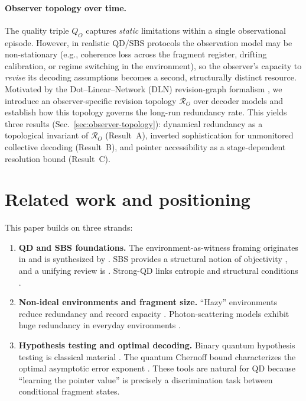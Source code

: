 \documentclass[11pt]{article}
\newcommand{\cR}{\mathcal{R}}
\newcommand{\1}{\mathbf{1}}
\theoremstyle{definition}
\theoremstyle{plain}
\begin{document}
\paragraph{Observer topology over time.}
The quality triple $Q_O$ captures \emph{static} limitations within a single observational episode.  However, in realistic QD/SBS protocols the observation model may be non-stationary (e.g., coherence loss across the fragment register, drifting calibration, or regime switching in the environment), so the observer's capacity to \emph{revise} its decoding assumptions becomes a second, structurally distinct resource.  Motivated by the Dot--Linear--Network (DLN) revision-graph formalism \citep{WuDLNCompression2026preprint}, we introduce an observer-specific revision topology $\cR_O$ over decoder models and establish how this topology governs the long-run redundancy rate.  This yields three results (Sec.~\ref{sec:observer-topology}): dynamical redundancy as a topological invariant of $\cR_O$ (Result~A), inverted sophistication for unmonitored collective decoding (Result~B), and pointer accessibility as a stage-dependent resolution bound (Result~C).

\section{Related work and positioning}

This paper builds on three strands:

\begin{enumerate}[leftmargin=2em]
\item \textbf{QD and SBS foundations.}
The environment-as-witness framing originates in \citet{OPZ2004} and is synthesized by \citet{Zurek2009,BlumeKohoutZurek2006}.
SBS provides a structural notion of objectivity \citep{HorodeckiKorbiczHorodecki2015}, and a unifying review is \citet{KorbiczReview2021}.
Strong-QD links entropic and structural conditions \citep{LeOlayaCastro2019}.
\item \textbf{Non-ideal environments and fragment size.}
``Hazy'' environments reduce redundancy and record capacity \citep{ZwolakQuanZurek2009}.
Photon-scattering models exhibit huge redundancy in everyday environments \citep{RiedelZurek2010,RiedelZurek2011}.
\item \textbf{Hypothesis testing and optimal decoding.}
Binary quantum hypothesis testing is classical material \citep{Helstrom1976,Watrous2018}.
The quantum Chernoff bound characterizes the optimal asymptotic error exponent \citep{Audenaert2007,NussbaumSzkola2009}.
These tools are natural for QD because ``learning the pointer value'' is precisely a discrimination task between conditional fragment states.
\end{enumerate}
\end{document}
